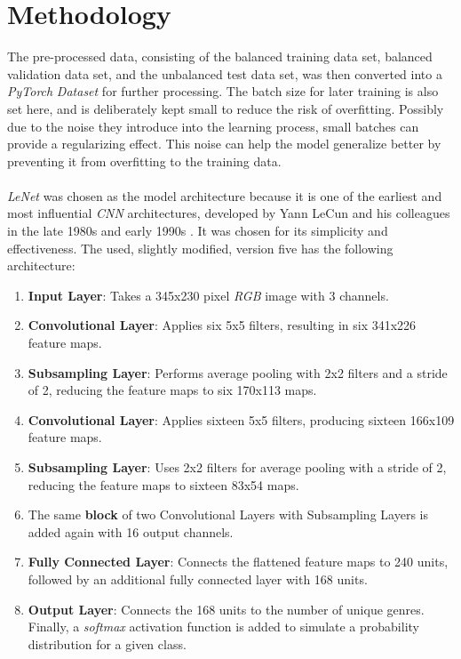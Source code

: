 \documentclass[a4paper, 11pt]{article}
\begin{document}
\section{Methodology}
    The pre-processed data, consisting of the balanced training data set, balanced validation data set, and the unbalanced test data set, was then converted into a \textit{PyTorch} \textit{Dataset} for further processing. The batch size for later training is also set here, and is deliberately kept small to reduce the risk of overfitting. Possibly due to the noise they introduce into the learning process, small batches can provide a regularizing effect. This noise can help the model generalize better by preventing it from overfitting to the training data.\\\\
    \textit{LeNet} was chosen as the model architecture because it is one of the earliest and most influential \textit{CNN} architectures, developed by Yann LeCun and his colleagues in the late 1980s and early 1990s \cite{726791}. It was chosen for its simplicity and effectiveness. The used, slightly modified, version five has the following architecture:
    \begin{enumerate}
        \item \textbf{Input Layer}: Takes a 345x230 pixel \textit{RGB} image with 3 channels.
        \item \textbf{Convolutional Layer}: Applies six 5x5 filters, resulting in six 341x226 feature maps.
        \item \textbf{Subsampling Layer}: Performs average pooling with 2x2 filters and a stride of 2, reducing the feature maps to six 170x113 maps.
        \item \textbf{Convolutional Layer}: Applies sixteen 5x5 filters, producing sixteen 166x109 feature maps. 
        \item \textbf{Subsampling Layer}: Uses 2x2 filters for average pooling with a stride of 2, reducing the feature maps to sixteen 83x54 maps.
        \item The same \textbf{block} of two Convolutional Layers with Subsampling Layers is added again with 16 output channels. 
        \item \textbf{Fully Connected Layer}: Connects the flattened feature maps to 240 units, followed by an additional fully connected layer with 168 units.
        \item \textbf{Output Layer}: Connects the 168 units to the number of unique genres. Finally, a \textit{softmax} activation function is added to simulate a probability distribution for a given class. 
    \end{enumerate}
\end{document}
